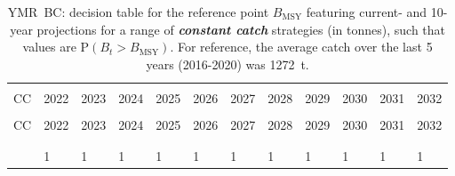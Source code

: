 \documentclass[11pt]{book}
\newcommand{\Bmsy}{B_\text{MSY}}
\newcommand{\itbf}[1]{\textit{\textbf{#1}}}
\begin{document}
\begin{longtable}[c]{>{\raggedright\let\newline\\\arraybackslash\hspace{0pt}}p{0.51in}>{\raggedleft\let\newline\\\arraybackslash\hspace{0pt}}p{0.51in}>{\raggedleft\let\newline\\\arraybackslash\hspace{0pt}}p{0.52in}>{\raggedleft\let\newline\\\arraybackslash\hspace{0pt}}p{0.52in}>{\raggedleft\let\newline\\\arraybackslash\hspace{0pt}}p{0.52in}>{\raggedleft\let\newline\\\arraybackslash\hspace{0pt}}p{0.52in}>{\raggedleft\let\newline\\\arraybackslash\hspace{0pt}}p{0.52in}>{\raggedleft\let\newline\\\arraybackslash\hspace{0pt}}p{0.52in}>{\raggedleft\let\newline\\\arraybackslash\hspace{0pt}}p{0.52in}>{\raggedleft\let\newline\\\arraybackslash\hspace{0pt}}p{0.52in}>{\raggedleft\let\newline\\\arraybackslash\hspace{0pt}}p{0.52in}>{\raggedleft\let\newline\\\arraybackslash\hspace{0pt}}p{0.52in}}
  \caption{YMR~BC: decision table for the reference point $\Bmsy$ featuring current- and 10-year projections for a range of \itbf{constant catch} strategies (in tonnes), such that values are P$(B_t > \Bmsy)$.  For reference, the average catch over the last 5 years (2016-2020) was 1272~t. } \label{tab:ymr.gmu.Bmsy.CCs}\\  \hline\\[-2.2ex]  CC  & 2022 & 2023 & 2024 & 2025 & 2026 & 2027 & 2028 & 2029 & 2030 & 2031 & 2032 \\[0.2ex]\hline\\[-1.5ex]  \endfirsthead   \hline  CC  & 2022 & 2023 & 2024 & 2025 & 2026 & 2027 & 2028 & 2029 & 2030 & 2031 & 2032 \\[0.2ex]\hline\\[-1.5ex]  \endhead  \hline\\[-2.2ex]   \endfoot  \hline \endlastfoot  0 & 1 & 1 & 1 & 1 & 1 & 1 & 1 & 1 & 1 & 1 & 1 \\ 

\end{longtable}
\end{document}
